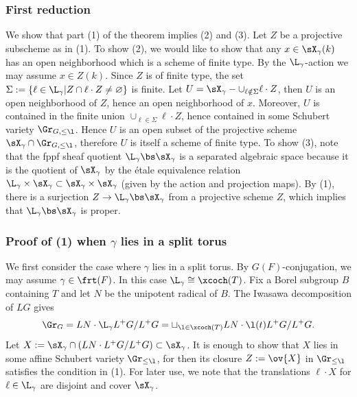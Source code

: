 \subsubsection{First reduction} We show that part (1) of the theorem implies (2) and (3). Let $Z$ be a projective subscheme as in (1). To show (2), we would like to show that any $x\in \sX_{\gamma}(k)$ has an open neighborhood which is a scheme of finite type. By the $\L_{\gamma}$-action we may assume $x\in Z(k)$. Since $Z$ is of finite type, the set $\Sigma:=\{\ell\in \L_{\gamma}|Z\cap\ell\cdot Z\neq\varnothing\}$ is finite. Let $U=\sX_{\gamma}-\cup_{\ell\notin\Sigma}\ell\cdot Z$, then $U$ is an open neighborhood of $Z$, hence an open  neighborhood of $x$. Moreover, $U$ is contained in the finite union $\cup_{\ell\in\Sigma}\ell\cdot Z$, hence contained in some Schubert variety $\Gr_{G,\leq\l}$. Hence $U$ is an open subset of the projective scheme $\sX_{\gamma}\cap\Gr_{G,\leq\l}$, therefore $U$ is itself a scheme of finite type. To show (3), note that the fppf sheaf quotient $\L_{\gamma}\bs\sX_{\gamma}$ is a separated algebraic space because it is the quotient of $\sX_{\gamma}$ by the \'etale equivalence relation $\L_{\gamma}\times\sX_{\gamma}\subset \sX_{\gamma}\times\sX_{\gamma}$ (given by the action and projection maps). By (1), there is a surjection $Z\to \L_{\gamma}\bs\sX_{\gamma}$ from a projective scheme $Z$, which implies that $\L_{\gamma}\bs\sX_{\gamma}$ is proper.

\subsubsection{Proof of (1) when $\gamma$ lies in a split torus}\label{sss:split case} We first consider the case where $\gamma$ lies in a split torus. By $G(F)$-conjugation, we may assume $\gamma\in\frt(F)$. In this case $\L_{\gamma}\cong\xcoch(T)$. Fix a Borel subgroup $B$ containing $T$ and let $N$ be the unipotent radical of $B$. The Iwasawa decomposition of $LG$ gives
\begin{equation*}
\Gr_{G}=LN\cdot \L_{\gamma}L^{+}G/L^{+}G=\sqcup_{\l\in\xcoch(T)}LN\cdot \l(t)L^{+}G/L^{+}G.
\end{equation*}
Let $X:=\sX_{\gamma}\cap (LN\cdot L^{+}G/L^{+}G)\subset \sX_{\gamma}$. It is enough to show that $X$ lies in some affine Schubert variety $\Gr_{\leq \l}$, for then its closure $Z:=\ov{X}$ in $\Gr_{\leq\l}$ satisfies the condition in (1). For later use, we note that the translations $\ell\cdot X$ for $\ell\in \L_{\gamma}$ are disjoint and cover $\sX_{\gamma}$. 

